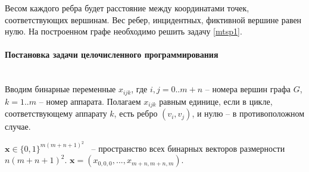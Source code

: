 \documentclass[a4paper,14pt,russian]{article}
\begin{document}
Весом каждого ребра будет расстояние между координатами точек, соответствующих вершинам. Вес ребер, инцидентных, фиктивной вершине равен нулю.
На построенном графе необходимо решить задачу \eqref{mtsp1}.




\paragraph{Постановка задачи целочисленного программирования} ~\\

Вводим бинарные переменные $x_{i j k}$, где $i, j = 0..m+n$ -- номера вершин графа $G$, $k = 1..m$ -- номер аппарата. Полагаем $x_{i j k}$ равным единице, если в цикле, соответствующему аппарату $k$, есть ребро $(v_i, v_j)$, и нулю -- в противоположном случае.

$\mathbf{x} \in \{0,1\}^{m (m+n+1)^2}$ ~-- пространство всех бинарных векторов размерности $n (m+n+1)^2$. $\mathbf{x} = (x_{0, 0, 0}, ..., x_{m+n, m+n, m})$.
\end{document}

